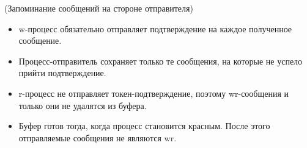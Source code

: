 \begin{algorithm}(Запоминание сообщений на стороне отправителя)
    \enewline
    \begin{itemize}
        \item w-процесс обязательно отправляет подтверждение на каждое
            полученное сообщение.
        \item Процесс-отправитель сохраняет только те сообщения, на которые
            не успело прийти подтверждение.
        \item r-процесс не отправляет токен-подтверждение, поэтому wr-сообщения
            и только они не удалятся из буфера.
        \item Буфер готов тогда, когда процесс становится красным. После этого
            отправляемые сообщения не являются wr.
    \end{itemize}
\end{algorithm} 

